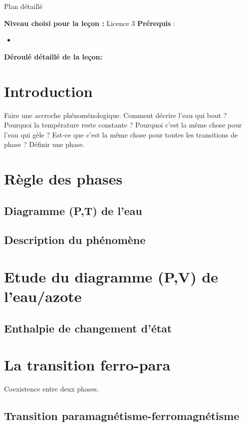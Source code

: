 \begin{reportBlock}{Plan détaillé}

  \textbf{Niveau choisi pour la leçon :} Licence 3
  \newline
  \textbf{Prérequis} : \begin{itemize}
      \item 
  \end{itemize}

  \textbf{Déroulé détaillé de la leçon: }  
  
  \section*{Introduction}
Faire une accroche phénoménologique. Comment décrire l'eau qui bout ? Pourquoi la température reste constante ? Pourquoi c'est la même chose pour l'eau qui gèle ? Est-ce que c'est la même chose pour toutes les transitions de phase ? Définir une phase.

  \section{Règle des phases}

  \subsection{Diagramme (P,T) de l'eau}
  
  \subsection{Description du phénomène}
  
  
  \section{Etude du diagramme (P,V) de l'eau/azote}
  
  
  \subsection{Enthalpie de changement d'état} 


  \section{La transition ferro-para}
  Coexistence entre deux phases. 
\subsection{Transition paramagnétisme-ferromagnétisme}


\end{reportBlock}